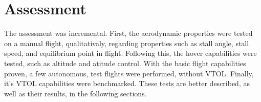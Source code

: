 \chapter{Assessment}

The assessment was incremental. First, the aerodynamic properties were tested on a manual flight, qualitativaly, regarding properties such as stall angle, stall speed, and equilibrium point in flight. Following this, the hover capabilities were tested, such as altitude and atitude control. With the basic flight capabilities proven, a few autonomous, test flights were performed, without VTOL. Finally, it's VTOL capabilities were benchmarked. These tests are better described, as well as their results, in the following sections.


